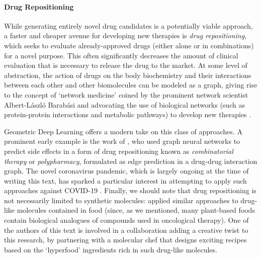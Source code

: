\paragraph{Drug Repositioning} 
%
While generating entirely novel drug candidates is a potentially viable approach, a faster and cheaper avenue for developing new therapies is \emph{drug repositioning}, which seeks to evaluate already-approved drugs (either alone or in combinations) for a novel purpose. 
%
This often significantly decreases the amount of clinical evaluation that is necessary to release the drug to the market. %
At some level of abstraction, the action of drugs on the body biochemistry and their interactions between each other and other biomolecules can be modeled as a graph, giving rise to the concept of `network medicine' coined by the prominent network scientist Albert-L{\'a}szl{\'o} Barab{\'a}si and advocating the use of biological networks (such as protein-protein interactions and metabolic pathways) to develop new therapies \citep{barabasi2011network}. 


Geometric Deep Learning offers a modern take on this class of  approaches. A prominent early example is the work of \cite{zitnik2018modeling}, who used graph neural networks to predict side effects in a form of drug repositioning known as {\em combinatorial therapy} or {\em polypharmacy}, formulated as edge prediction in a drug-drug interaction graph. 
%
The novel coronavirus pandemic, which is largely ongoing at the time of writing this text, has sparked a particular interest in %
attempting to apply such approaches against COVID-19 \citep{gysi2020network}.
%
Finally, we should note that drug repositioning is not necessarily limited to synthetic molecules: \cite{veselkov2019hyperfoods} applied similar approaches to drug-like molecules contained in food (since, as we mentioned, many plant-based foods contain biological analogues of compounds used in oncological therapy). 
%
One of the authors of this text is involved in a collaboration adding a creative twist to this research, by partnering with a molecular chef that designs exciting recipes based on the  `hyperfood' ingredients rich in such drug-like molecules. 


